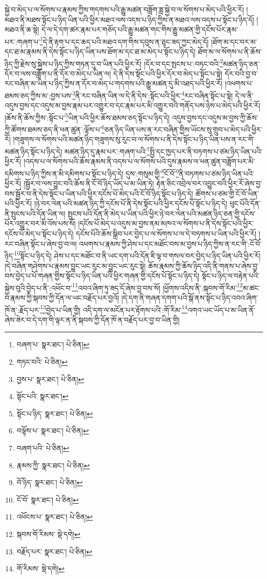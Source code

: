 སྐྱེ་བ་མེད་པ་ལ་སོགས་པ་རྣམས་ཀྱིས་གདགས་པའི་རྒྱུ་མཚན་བཟློག་ཟླ་སྐྱེ་བ་ལ་སོགས་པ་མེད་པའི་ཕྱིར་རོ། །མཐའ་ནི་མཐས་སྟོང་པ་ཉིད་ཡིན་པའི་ཕྱིར་མཐའ་ལས་འདས་པ་ཉིད་ཀྱིས་ན་མཐའ་ལས་འདས་པ་སྟོང་པ་ཉིད་དོ། །མཐའ་ནི་ཆ་སྟེ། དེ་ལ་དེ་དག་ཚར་རྣམ་པར་གཅོད་པའི་རྒྱུ་མཚན་གང་གིས་རྒྱུ་མཚན་གྱི་དངོས་པོར་རྣམ་པར་:གཞག་པ་\footnote{བཞག་པ་  སྣར་ཐང་།  པེ་ཅིན། }དེ་ནི་རྟག་པ་དང་ཆད་པའི་མཐའ་དག་གིས་དབུས་ན་ཅུང་ཟད་ཀྱང་མེད་དོ། །ཐོག་མ་དང་བར་མ་དང་ཐ་མ་རྣམས་ནི་དེས་སྟོང་པ་ཉིད་ཡིན་པས་ཐོག་མ་དང་ཐ་མ་མེད་པ་སྟོང་པ་ཉིད་དེ། ཐོག་མ་ལ་སོགས་པ་ནི་ཆོས་ཉིད་ཀྱི་རྗེས་སུ་སྐྱེས་པ་ཉིད་ཀྱིས་གཏན་དུ་བ་ཡིན་པའི་ཕྱིར་རོ། །དོར་བ་དང་སྤངས་པ་:བཏང་བའི་\footnote{གཏང་བའི་  པེ་ཅིན། }མཚན་ཉིད་ཅན་དོར་བ་ལས་བཟློག་པ་ནི་དོར་བ་མེད་པ་ཡིན་ལ། དེ་ནི་དེས་སྟོང་པའི་ཕྱིར་དོར་བ་མེད་པ་སྟོང་པ་སྟེ། དོར་བའི་བྱ་བ་རང་བཞིན་མ་ཡིན་པ་ཉིད་ཀྱིས་ན་དོར་བ་མེད་པ་གདགས་པའི་རྒྱུ་མཚན་དུ་མི་འཐད་པའི་ཕྱིར་རོ། །འཕགས་པ་ཐམས་ཅད་ཀྱིས་མ་:བྱས་པས་\footnote{བྱས་པ་  སྣར་ཐང་།  པེ་ཅིན། }ནི་རང་བཞིན་ཡིན་ལ་དེ་ནི་དེས་:སྟོང་པའི་ཕྱིར་\footnote{སྟོང་པའི་  སྣར་ཐང་། }རང་བཞིན་སྟོང་པ་སྟེ། དེ་ལ་ནི་འདུས་བྱས་དང་འདུས་མ་བྱས་རྣམ་པར་འགྱུར་བ་དང་རྣམ་པར་མི་འགྱུར་བའི་གནོད་པས་ཉེས་པ་མེད་པའི་ཕྱིར་རོ། །ཆོས་ནི་ཆོས་ཀྱིས་:སྟོང་པ་\footnote{སྟོང་པ་ཉིད་  སྣར་ཐང་།  པེ་ཅིན། }ཡིན་པའི་ཕྱིར་ཆོས་ཐམས་ཅད་སྟོང་པ་ཉིད་དེ། འདུས་བྱས་དང་འདུས་མ་བྱས་ཀྱི་ཆོས་ཀྱི་ཚོགས་ཐམས་ཅད་ནི་ཕན་ཚུན་:ལྟོས་པ་\footnote{བལྟོས་པ་  སྣར་ཐང་།  པེ་ཅིན། }ཅན་ཉིད་ཡིན་པས་ན་རང་བཞིན་གྱིས་ཡོངས་སུ་གྲུབ་པ་མེད་པའི་ཕྱིར་རོ། །གཟུགས་ལ་སོགས་པའི་མཚན་ཉིད་གཟུགས་སུ་རུང་བ་ལ་སོགས་པ་ནི་དེས་སྟོང་པ་ཉིད་ཡིན་པས་ན་རང་གི་མཚན་ཉིད་སྟོང་པ་ཉིད་དེ། མཚན་ཉིད་དུ་རྣམ་པར་:གཞག་པའི་\footnote{བཞག་པའི་  པེ་ཅིན། }སྤྱི་དང་ཁྱད་པར་ནི་བཏགས་པ་ཙམ་ཉིད་ཡིན་པའི་ཕྱིར་རོ། །འདས་པ་ལ་སོགས་པའི་ཆོས་རྣམས་ནི་འདས་པ་ལ་སོགས་པའི་དུས་རྣམས་ལ་ཕན་ཚུན་བཟློག་པར་མི་དམིགས་པ་ཉིད་ཀྱིས་ན་མི་དམིགས་པ་སྟོང་པ་ཉིད་དེ། དུས་:གསུམ་གྱི་\footnote{རྣམས་ཀྱི་  སྣར་ཐང་།  པེ་ཅིན། }ངོ་བོ་\footnote{བོ་ཉིད་  སྣར་ཐང་།  པེ་ཅིན། }ནི་བཏགས་པ་ཙམ་ཉིད་ཡིན་པའི་ཕྱིར་རོ། །སྦྱོར་བ་ལས་བྱུང་བའི་ཆོས་ནི་ངོ་བོ་ཉིད་ཡོད་པ་མ་ཡིན་ཏེ། རྟེན་ཅིང་འབྲེལ་བར་འབྱུང་བའི་ཕྱིར་རོ་ཞེས་བྱ་བས་སྦྱོར་བ་ནི་དེས་སྟོང་པ་ཡིན་པའི་ཕྱིར་དངོས་པོ་མེད་པའི་ངོ་བོ་ཉིད་སྟོང་པ་ཉིད་དེ། ཚོགས་པ་ཙམ་གྱི་ངོ་བོ་ཡིན་པའི་ཕྱིར་རོ། །ཉེ་བར་ལེན་པའི་མཚན་ཉིད་ཀྱི་དངོས་པོ་ནི་དེས་སྟོང་པའི་ཕྱིར་དངོས་པོ་སྟོང་པ་ཉིད་དེ། ཕུང་པོའི་དོན་ནི་སྤུངས་པའི་དོན་ཡིན་ལ། སྤུངས་པའི་དོན་ནི་མེད་པ་ཡིན་པའི་ཕྱིར་ཉེ་བར་ལེན་པའི་མཚན་ཉིད་ཅན་གྱི་དངོས་པོར་འགྱུར་བར་མི་འོས་པས་སོ། །དངོས་པོ་མེད་པ་འདུས་མ་བྱས་ནམ་མཁའ་ལ་སོགས་པ་ནི་དེས་སྟོང་པའི་ཕྱིར་དངོས་པོ་མེད་པ་སྟོང་པ་ཉིད་དེ། དངོས་པོའི་ཆོས་སྒྲིབ་པར་བྱེད་པ་ལ་སོགས་པ་ལ་དེ་བཏགས་པ་ཡིན་པའི་ཕྱིར་རོ། །རང་བཞིན་སྟོང་པ་ཞེས་བྱ་བ་ལ། འཕགས་པ་རྣམས་ཀྱི་ཤེས་པ་དང་མཐོང་བས་མ་བྱས་པ་ཉིད་ཀྱིས་ན་རང་གི་:ངོ་བོ་ཉིད་\footnote{ངོ་བོ་  སྣར་ཐང་།  པེ་ཅིན། }སྟོང་པ་ཉིད་དེ། ཤེས་པ་དང་མཐོང་བ་ནི་ཡང་དག་པའི་དོན་ཇི་ལྟ་བ་གསལ་བར་བྱེད་པ་ཉིད་ཡིན་པའི་ཕྱིར་རོ། །དེ་བཞིན་གཤེགས་པ་རྣམས་བྱུང་ཡང་རུང་མ་བྱུང་ཡང་རུང་སྟེ། ཆོས་རྣམས་ཀྱི་ཆོས་ཉིད་འདི་ནི་གནས་པ་ཞེས་བྱ་བས་བྱེད་པ་པོ་གཞན་གྱིས་སྟོང་པ་ཉིད་ཡིན་པའི་ཕྱིར་གཞན་གྱི་དངོས་པོ་སྟོང་པ་ཉིད་དེ། སྟོང་པ་ཉིད་ལ་བརྟེན་པའི་སྐྱེས་བུའི་བྱེད་པ་ནི་:འཕོང་བ་\footnote{འཕོངས་པ་  སྣར་ཐང་།  པེ་ཅིན། }འབའ་ཞིག་ཏུ་ཟད་དོ་ཞེས་བྱ་བས་སོ། །ཕྱོགས་འདིས་ནི་:སྐབས་གོ་རིམ་\footnote{སྐབས་གོ་རིམས་  སྡེ་དགེ། }མ་ཚང་བ་རྣམས་ཀྱི་སྐབས་ཀྱི་དོན་ལ་ཡང་བརྗོད་པར་བྱའོ། །དེ་དག་ནི་གཞན་དགག་པའི་སྒོ་ནས་སྟོང་པ་ཉིད་འབའ་ཞིག་ཁོ་ན་:རྗོད་པར་\footnote{བརྗོད་པར་  སྣར་ཐང་།  པེ་ཅིན། }བྱེད་པ་ཡིན་གྱི། འདི་དག་ལ་མངོན་པར་རྟོགས་པའི་:གོ་རིམ་\footnote{གོ་རིམས་  སྡེ་དགེ། }འགའ་ཡང་ཡོད་པ་མ་ཡིན་ནོ་ཞེས་ཟེར་བ་དེ་དག་གི་ལྟར་ན་ནི་སྐབས་ཀྱི་དོན་ཁོ་ན་བརྗོད་པར་བྱ་བ་ཡིན་གྱི། 